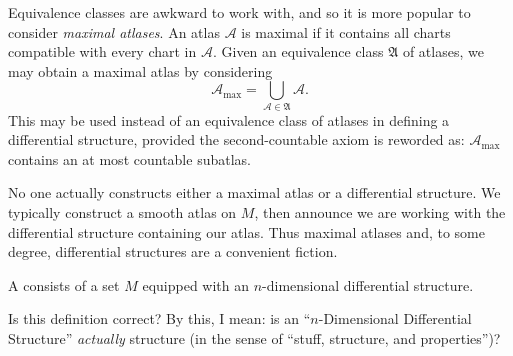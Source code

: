 \begin{remark}
  Equivalence classes are awkward to work with, and so it is more
  popular to consider \emph{maximal atlases}. An atlas $\mathcal{A}$ is
  maximal if it contains all charts compatible with every chart in
  $\mathcal{A}$. Given an equivalence class $\mathfrak{A}$ of atlases,
  we may obtain a maximal atlas by considering
  \begin{equation}
    \mathcal{A}_{\text{max}} = \bigcup_{\mathcal{A}\in\mathfrak{A}}\mathcal{A}.
  \end{equation}
  This may be used instead of an equivalence class of atlases in
  defining a differential structure, provided the second-countable axiom
  is reworded as: $\mathcal{A}_{\text{max}}$ contains an at most
  countable subatlas.
\end{remark}

\begin{remark}
No one actually constructs either a maximal atlas or a differential
structure. We typically construct a smooth atlas on $M$, then announce
we are working with the differential structure containing our
atlas. Thus maximal atlases and, to some degree, differential structures
are a convenient fiction.
\end{remark}

\begin{definition}
  A  consists of a set $M$
  equipped with an $n$-dimensional differential structure.
\end{definition}

\begin{puzzle}
  Is this definition correct? By this, I mean: is an
  ``$n$-Dimensional Differential Structure''
  \emph{actually} structure (in the sense of ``stuff, structure, and properties'')?
\end{puzzle}